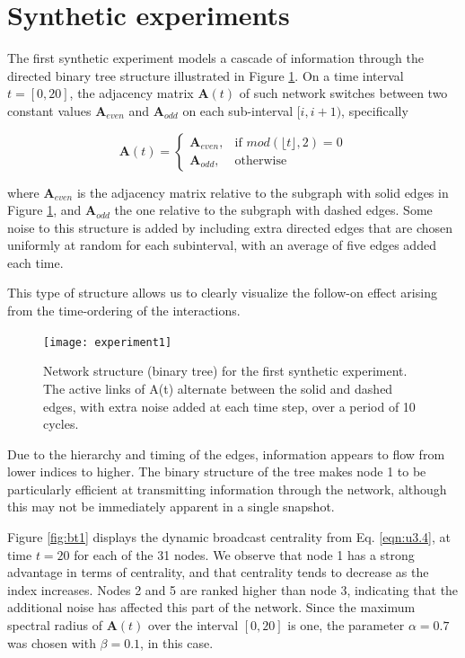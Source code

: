 \section{Synthetic experiments}
\label{sec:synexp}
The first synthetic experiment models a cascade of information through the directed binary
tree structure illustrated in Figure \ref{fig:exp1}. On a time interval $t = [0, 20]$, the adjacency
matrix $\mathbf{A}(t)$ of such network switches between two constant values $\mathbf{A}_{even}$ and $\mathbf{A}_{odd}$ on each sub-interval $[i, i + 1)$, specifically

\begin{equation*}
\mathbf{A}(t)=
    \begin{cases}
        \mathbf{A}_{even}, & \text{if } mod(\lfloor t \rfloor, 2) = 0\\
        \mathbf{A}_{odd}, & \text{otherwise} 
    \end{cases}
\end{equation*}

where $\mathbf{A}_{even}$ is the adjacency matrix relative to the subgraph with solid edges in Figure \ref{fig:exp1}, and $\mathbf{A}_{odd}$ the one relative to the subgraph with dashed edges. Some noise to this structure is added by including extra directed edges that are chosen uniformly at random for each subinterval, with an average of five edges added each time. 

This type of structure allows us to clearly visualize the follow-on effect arising from the time-ordering of the interactions.

\begin{figure}[h]\centering
    \texttt{[image: experiment1]}
    \caption{Network structure (binary tree) for the first synthetic experiment. The active links of A(t) alternate between the solid and dashed edges, with extra noise added at each time step, over a period of 10 cycles.}
    \label{fig:exp1}
    \bigskip
\end{figure}

Due to the hierarchy and timing of the edges, information appears to flow from lower indices to higher. The binary structure of the tree makes node 1 to be particularly efficient at transmitting information through the network, although this may not be immediately apparent in a single snapshot.

Figure \ref{fig:bt1} displays the dynamic broadcast centrality from Eq. \ref{eqn:u3.4}, at time $t=20$ for each of the 31 nodes. We observe that node 1 has a strong advantage in terms of centrality, and that centrality tends to decrease as the index increases. Nodes 2 and 5 are ranked higher than node 3, indicating that the additional noise has affected this part of the network. Since the maximum spectral radius of $\mathbf{A}(t)$ over the interval $[0, 20]$ is one, the parameter $\alpha=0.7$ was chosen with $\beta=0.1$, in this case.

